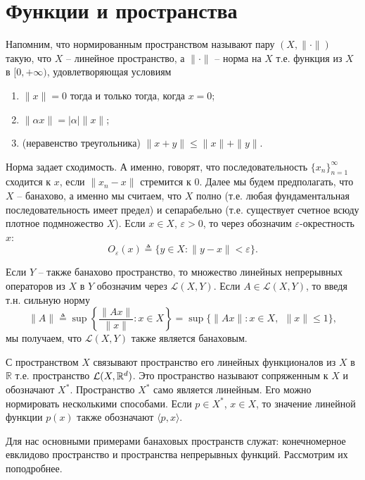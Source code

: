 \documentclass[a4paper,12pt]{report}
\begin{document}
\section*{Функции и пространства}
Напомним, что нормированным пространством называют пару $(X,\|\cdot\|)$ такую, что $X$ -- линейное пространство, а $\|\cdot\|$ -- норма на $X$ т.е. функция из $X$ в $[0,+\infty)$, удовлетворяющая условиям
\begin{enumerate}
	\item $\|x\|=0$ тогда и только тогда, когда $x=0$;
	\item $\|\alpha x\|=|\alpha| \|x\|$;
	\item (неравенство треугольника) $\|x+y\|\leq \|x\|+\|y\|$.
\end{enumerate} Норма задает сходимость. А именно, говорят, что последовательность $\{x_n\}_{n=1}^\infty$ сходится к $x$, если $\|x_n-x\|$ стремится к 0. Далее мы будем предполагать, что $X$ -- банахово, а именно мы считаем, что $X$ полно (т.е. любая фундаментальная последовательность имеет предел) и сепарабельно (т.е. существует счетное всюду плотное подмножество $X$). Если $x\in X$, $\varepsilon>0$, то через обозначим $\varepsilon$-окрестность $x$:
$$O_\varepsilon(x)\triangleq \{y\in X:\|y-x\|<\varepsilon\}. $$ 

Если $Y$ -- также банахово пространство, то множество линейных непрерывных операторов из $X$ в $Y$ обозначим через $\mathcal{L}(X,Y)$. Если $A\in\mathcal{L}(X,Y)$, то введя т.н. сильную норму
$$\|A\|\triangleq \sup\left\{\frac{\|Ax\|}{\|x\|}:x\in X\right\}=\sup\{\|Ax\|:x\in X,\ \ \|x\|\leq 1\}, $$ мы получаем, что $\mathcal{L}(X,Y)$ также является банаховым.


С пространством $X$ связывают пространство его линейных функционалов из $X$ в $\mathbb{R}$ т.е. пространство $\mathcal{L}(X,\mathbb{R}^d)$. Это пространство называют сопряженным к $X$ и обозначают $X^*$. Пространство $X^*$ само является линейным. Его можно нормировать несколькими способами. Если $p\in X^*$, $x\in X$, то значение линейной функции $p(x)$ также обозначают $\langle p,x\rangle$.

Для нас основными примерами банаховых пространств служат: конечномерное евклидово пространство и пространства непрерывных функций. Рассмотрим их поподробнее. 
\end{document}
